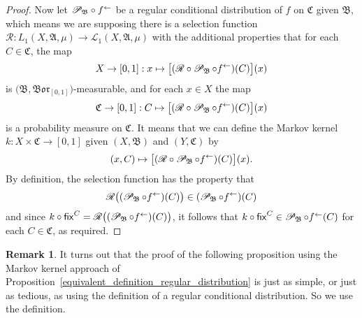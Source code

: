 \documentclass[
twoside=true,
paper=letter,
fontsize=11pt,
pagesize=auto,
leqno,
openany,
headsepline,
overfullrule,
]{scrbook}
\theoremstyle{plain}
\theoremstyle{plain}
\theoremstyle{definition}
\newtheorem{rmk}[thm]{Remark}
\theoremstyle{bfnoteitalic}
\theoremstyle{bfnoteroman}
\newcommand{\sigalg}[1]{\mathfrak{#1}}
\newcommand{\cali}[1]{\mathscr{#1}}
\newcommand{\sfop}[1]{\mathsf{#1}}
\newcommand{\condprobop}[1]{\mathop{\cali{P}\hspace{-1pt}}\nolimits_{#1}}
\newcommand{\borel}{\mathfrak{Bor}}
\newcommand{\preimage}[1]{#1^{\leftarrow}}
\newcommand{\sigmaalgebra}{\sigalg{A}}
\newcommand{\sigmaalgebraii}{\sigalg{B}}
\newcommand{\sigmaalgebraiii}{\sigalg{C}}
\newcommand{\Lone}{L_1(\measurespace, \sigmaalgebra, \measure)}
\newcommand{\caliLone}{\cali{L}_1(\measurespace, \sigmaalgebra, \measure)}
\newcommand{\function}{f}
\newcommand{\measurespace}{X}
\newcommand{\measurespaceii}{Y}
\newcommand{\mspaceelt}{x}
\newcommand{\measure}{\mu}
\newcommand{\setiii}{C}
\newcommand{\regular}{\cali{R}}
\newcommand{\markovkernel}{k}
\newcommand{\fixinthesecond}[1]{\sfop{fix}^{#1}}
\begin{document}
\begin{proof}
Now let 
${\condprobop{\sigmaalgebraii}}\circ \preimage{\function}$ 
be a regular conditional distribution of 
$\function$ on $\sigmaalgebraiii$ given $\sigmaalgebraii$, which means we are supposing there is a selection function
$\regular:\Lone\to\caliLone$
with the additional properties that for each
$\setiii\in\sigmaalgebraiii$, the map 
\[
\measurespace\to [0,1] : \mspaceelt\mapsto
\bigl[ (\regular\circ\condprobop{\sigmaalgebraii}\circ\preimage{\function}) (\setiii)\bigr](\mspaceelt)
\]
is $\bigl(\sigmaalgebraii, \borel_{[0,1]}\bigr)$\hyp{}measurable, and for each 
$\mspaceelt\in\measurespace$ the  map
\[
\sigmaalgebraiii\to [0,1]: \setiii \mapsto 
\bigl[ (\regular\circ\condprobop{\sigmaalgebraii}\circ\preimage{\function}) (\setiii)\bigr](\mspaceelt)
\]
is a probability measure on $\sigmaalgebraiii$.
It means that we can define the Markov kernel
$\markovkernel:\measurespace\times\sigmaalgebraiii\to [0,1]$ 
given $(\measurespace, \sigmaalgebraii)$ and $(\measurespaceii, \sigmaalgebraiii)$
by 
\[
(\mspaceelt,\setiii)
\mapsto
\bigl[ (\regular\circ\condprobop{\sigmaalgebraii}\circ\preimage{\function}) (\setiii)\bigr](\mspaceelt).
\]
By definition, the selection function has the property that 
\[
\regular
\bigl((\condprobop{\sigmaalgebraii}\circ\preimage{\function}) (\setiii)\bigr)
\in
(\condprobop{\sigmaalgebraii}\circ\preimage{\function}) (\setiii)
\]
and since 
$k\circ\fixinthesecond{\setiii} 
=
\regular
\bigl((\condprobop{\sigmaalgebraii}\circ\preimage{\function}) (\setiii)\bigr)$,
it follows that
$k\circ\fixinthesecond{\setiii} \in 
\condprobop{\sigmaalgebraii}\circ \preimage{\function}(\setiii)$ for each 
$\setiii\in\sigmaalgebraiii$, as required.
\end{proof}



\begin{rmk}
It turns out that the proof of the following proposition using the Markov kernel approach of Proposition~\ref{equivalent_definition_regular_distribution}
is just as simple, or just as tedious,  as using the definition of a regular conditional distribution. So we use the definition.
\end{rmk}
\end{document}
